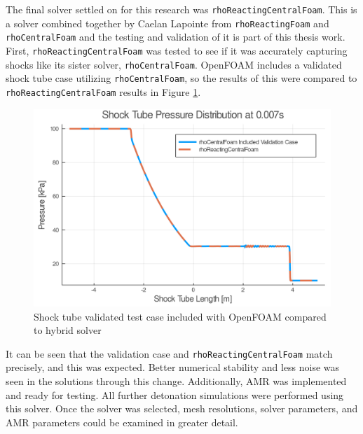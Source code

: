 The final solver settled on for this research was \verb|rhoReactingCentralFoam|. This is a solver combined together by Caelan Lapointe from \verb|rhoReactingFoam| and \verb|rhoCentralFoam| and the testing and validation of it is part of this thesis work. First, \verb|rhoReactingCentralFoam| was tested to see if it was accurately capturing shocks like its sister solver, \verb|rhoCentralFoam|. OpenFOAM includes a validated shock tube case utilizing \verb|rhoCentralFoam|, so the results of this were compared to \verb|rhoReactingCentralFoam|  results in Figure \ref{fig:sod}. 
\begin{figure}[]
\centering
\includegraphics[width=0.85\linewidth]{./figs/shocktube.png} 
\caption{Shock tube validated test case included with OpenFOAM compared to hybrid solver}
\label{fig:sod}
\end{figure}%
\noindent It can be seen that the validation case and \verb|rhoReactingCentralFoam| match precisely, and this was expected. Better numerical stability and less noise was seen in the solutions through this change. Additionally, AMR was implemented and ready for testing. All further detonation simulations were performed using this solver. Once the solver was selected, mesh resolutions, solver parameters, and AMR parameters could be examined in greater detail. 
